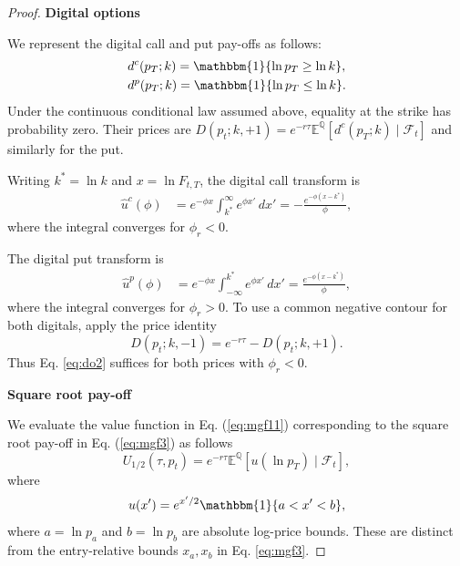 \documentclass[pdftex,11pt,a4paper] {article}
\begin{document}
\begin{proof}
\textbf{Digital options}

We represent the digital call and put pay-offs as follows:
\begin{equation} \label{eq:do1}
\begin{split}
&d^c(p_T;k)=\mathbbm{1}\{\ln p_T\geq\ln k\},\\
&d^p(p_T;k)=\mathbbm{1}\{\ln p_T\leq\ln k\}.
\end{split}
\end{equation}
Under the continuous conditional law assumed above, equality at the strike has probability zero. Their prices are $D(p_t;k,+1)=e^{-r\tau}\mathbb E^{\mathbb Q}[d^c(p_T;k)\mid\mathcal F_t]$ and similarly for the put.

Writing $k^*=\ln k$ and $x=\ln F_{t,T}$, the digital call transform is
\begin{equation} \label{eq:do2}
\begin{split}
\widehat u^c(\phi)
&=e^{-\phi x}\int_{k^*}^{\infty}e^{\phi x'}\,dx'
=-\frac{e^{-\phi(x-k^*)}}{\phi},
\end{split}
\end{equation}
where the integral converges for $\phi_r<0$.

The digital put transform is
\begin{equation} \label{eq:do3}
\begin{split}
\widehat u^p(\phi)
&=e^{-\phi x}\int_{-\infty}^{k^*}e^{\phi x'}\,dx'
=\frac{e^{-\phi(x-k^*)}}{\phi},
\end{split}
\end{equation}
where the integral converges for $\phi_r>0$. To use a common negative contour for both digitals, apply the price identity
\begin{equation} \label{eq:do4}
D(p_t;k,-1)=e^{-r\tau}-D(p_t;k,+1).
\end{equation}
Thus Eq. \eqref{eq:do2} suffices for both prices with $\phi_r<0$.

\textbf{Square root pay-off}

We evaluate the value function in Eq. (\ref{eq:mgf11}) corresponding to the square root pay-off in Eq. (\ref{eq:mgf3}) as follows
\begin{equation} \label{eq:srp1}
U_{1/2}(\tau,p_t)=e^{-r\tau}\mathbb E^{\mathbb Q}[u(\ln p_T)\mid\mathcal F_t],
\end{equation}
where
\begin{equation} \label{eq:srp2}
u(x')=e^{x'/2}\mathbbm{1}\{a<x'<b\},
\end{equation}
where $a=\ln p_a$ and $b=\ln p_b$ are absolute log-price bounds. These are distinct from the entry-relative bounds $x_a,x_b$ in Eq. \eqref{eq:mgf3}.


\end{proof}
\end{document}
